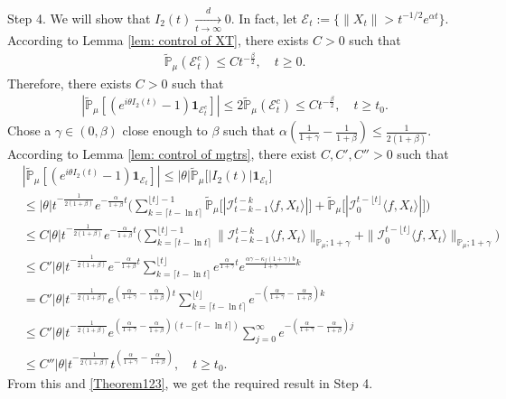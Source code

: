 \documentclass[12pt]{amsart}
\theoremstyle{plain}
\theoremstyle{definition}
\numberwithin{equation}{section}
\begin{document}
    Step 4. We will show that $I_2(t) \xrightarrow[t\to \infty]{d} 0$.
    In fact, let $\mathcal{E}_t:=\{\|X_t\|>t^{-1/2}e^{\alpha t}\}$. According to Lemma \ref{lem: control of XT}, there exists $C>0$ such that
\begin{align}
    \mathbb{\tilde{P}}_{\mu}(\mathcal{E}^c_t)\leq C t^{-\frac{\beta}{2}}, \quad t\geq0.
\end{align}
    Therefore, there exists $C>0$ such that
\begin{align}\label{Theorem123}
    |\mathbb{\tilde{P}}_{\mu}[(e^{i\theta I_2(t)}-1)\mathbf{1}_{\mathcal{E}^c_t}]|
    \leq 2\mathbb{\tilde{P}}_{\mu}(\mathcal{E}^c_t)\leq Ct^{-\frac{\beta}{2}},
    \quad t\geq t_0.
\end{align}
    Chose a $\gamma\in (0,\beta)$ close enough to $\beta$ such that $\alpha(\frac{1}{1+\gamma}-\frac{1}{1+\beta})\leq \frac{1}{2(1+\beta)}$.
	According to Lemma \ref{lem: control of mgtrs}, there exist $C,C',C''>0$ such that
\begin{align*}
    &|\mathbb{\tilde{P}}_{\mu} [ (e^{i\theta I_2(t)}-1)\mathbf{1}_{\mathcal{E}_t}]|
    \leq |\theta| \mathbb{\tilde{P}}_{\mu} \big[ |I_2(t)|\mathbf{1}_{\mathcal{E}_t}\big]
    \\&\leq|\theta| t^{-\frac{1}{2(1+\beta)}}e^{-\frac{\alpha}{1+\beta}t}\Big(\sum_{k=\lceil t-\ln t \rceil}^{\lfloor t \rfloor - 1}\mathbb{\tilde{P}}_{\mu}\big[| \mathcal{I}_{t-k-1}^{t-k}\langle f,X_t\rangle|\big] + \mathbb{\tilde{P}}_{\mu}\big[| \mathcal{I}_{0}^{t-\lfloor t\rfloor}\langle f,X_t\rangle|\big]\Big)
    \\& \leq C |\theta| t^{-\frac{1}{2(1+\beta)}}e^{-\frac{\alpha}{1+\beta}t}\Big(\sum_{k=\lceil t-\ln t \rceil}^{\lfloor t \rfloor - 1}\|\mathcal{I}_{t-k-1}^{t-k}\langle f,X_t\rangle\|_{\mathbb P_\mu; 1+\gamma} + \|\mathcal I_0^{t-\lfloor t \rfloor} \langle f, X_t\rangle\|_{\mathbb P_\mu;1+\gamma}\Big)
    \\ &\leq C' |\theta| t^{-\frac{1}{2(1+\beta)}}e^{-\frac{\alpha}{1+\beta}t}\sum_{k=\lceil t-\ln t \rceil}^{\lfloor t \rfloor}e^{\frac{\alpha}{1+\gamma}t}e^{\frac{\alpha\gamma-\kappa_f(1+\gamma)b}{1+\gamma}k}\\
    &= C' |\theta| t^{-\frac{1}{2(1+\beta)}}e^{(\frac{\alpha }{1+\gamma}-\frac{\alpha }{1+\beta})t} \sum_{k=\lceil t-\ln t \rceil}^{\lfloor t \rfloor}e^{-(\frac{\alpha}{1+\gamma}-\frac{\alpha}{1+\beta})k}\\
    &\leq C' |\theta| t^{-\frac{1}{2(1+\beta)}}e^{(\frac{\alpha }{1+\gamma}-\frac{\alpha }{1+\beta})(t - \lceil t - \ln t\rceil)} \sum_{j=0}^{\infty}e^{-(\frac{\alpha}{1+\gamma}-\frac{\alpha}{1+\beta})j}\\
    &\leq C''|\theta| t^{-\frac{1}{2(1+\beta)}}t^{(\frac{\alpha}{1+\gamma}- \frac{\alpha}{1+\beta})},
    \quad t\geq t_0.
\end{align*}
	From this and \eqref{Theorem123}, we get the required result in Step 4.
\end{document}
